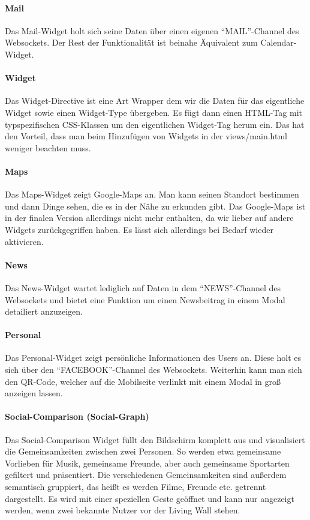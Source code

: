 \documentclass[10pt,a4paper]{report}
\newcommand{\code}[1]{{\fontfamily{cmvtt}\selectfont #1}}
\begin{document}
				\paragraph{Mail} 
					Das Mail-Widget holt sich seine Daten über einen eigenen "`MAIL"'-Channel des Websockets. Der Rest der Funktionalität ist beinahe Äquivalent zum Calendar-Widget.
				\paragraph{Widget}
					Das Widget-Directive ist eine Art Wrapper dem wir die Daten für das eigentliche Widget sowie einen Widget-Type übergeben. Es fügt dann einen HTML-Tag mit typspezifischen CSS-Klassen um den eigentlichen Widget-Tag herum ein. Das hat den Vorteil, dass man beim Hinzufügen von Widgets in der \code{views/main.html} weniger beachten muss.
				\paragraph{Maps}
					Das Maps-Widget zeigt Google-Maps an. Man kann seinen Standort bestimmen und dann Dinge sehen, die es in der Nähe zu erkunden gibt. Das Google-Maps ist in der finalen Version allerdings nicht mehr enthalten, da wir lieber auf andere Widgets zurückgegriffen haben. Es lässt sich allerdings bei Bedarf wieder aktivieren.
				\paragraph{News}
					Das News-Widget wartet lediglich auf Daten in dem "`NEWS"'-Channel des Websockets und bietet eine Funktion um einen Newsbeitrag in einem Modal detailiert anzuzeigen.
				\paragraph{Personal}
					Das Personal-Widget zeigt persönliche Informationen des Users an. Diese holt es sich über den "`FACEBOOK"'-Channel des Websockets. Weiterhin kann man sich den QR-Code, welcher auf die Mobilseite verlinkt mit einem Modal in groß anzeigen lassen.
				\paragraph{Social-Comparison (Social-Graph)}
					Das Social-Comparison Widget füllt den Bildschirm komplett aus und visualisiert die Gemeinsamkeiten zwischen zwei Personen. So werden etwa gemeinsame Vorlieben für Musik, gemeinsame Freunde, aber auch gemeinsame Sportarten gefiltert und präsentiert. Die verschiedenen Gemeinsamkeiten sind außerdem semantisch gruppiert, das heißt es werden Filme, Freunde etc. getrennt dargestellt. Es wird mit einer speziellen Geste geöffnet und kann nur angezeigt werden, wenn zwei bekannte Nutzer vor der Living Wall stehen.
\end{document}
